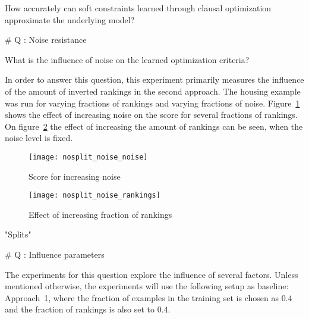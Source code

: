 \begin{question}
	How accurately can soft constraints learned through clausal optimization approximate the underlying model?
\end{question}



\# Q : Noise resistance

\begin{question}
	What is the influence of noise on the learned optimization criteria?
\end{question}

\begin{experiment}
	In order to answer this question, this experiment primarily measures the influence of the amount of inverted rankings in the second approach.
	The housing example was run for varying fractions of rankings and varying fractions of noise.
	Figure~\ref{fig:nosplit_noise_noise} shows the effect of increasing noise on the score for several fractions of rankings.
	On figure~\ref{fig:nosplit_noise_rankings} the effect of increasing the amount of rankings can be seen, when the noise level is fixed.

	\begin{figure}

		\caption{Score for increasing noise}
		\centering
			\texttt{[image: nosplit\_noise\_noise]}
		\label{fig:nosplit_noise_noise}

	\end{figure}

	\begin{figure}

		\caption{Effect of increasing fraction of rankings}
		\centering
			\texttt{[image: nosplit\_noise\_rankings]}
		\label{fig:nosplit_noise_rankings}

	\end{figure}

\end{experiment}

\begin{experiment}
	"Splits"
\end{experiment}


\# Q : Influence parameters

The experiments for this question explore the influence of several factors.
Unless mentioned otherwise, the experiments will use the following setup as baseline:
Approach~1, where the fraction of examples in the training set is chosen as $0.4$ and the fraction of rankings is also set to $0.4$.

